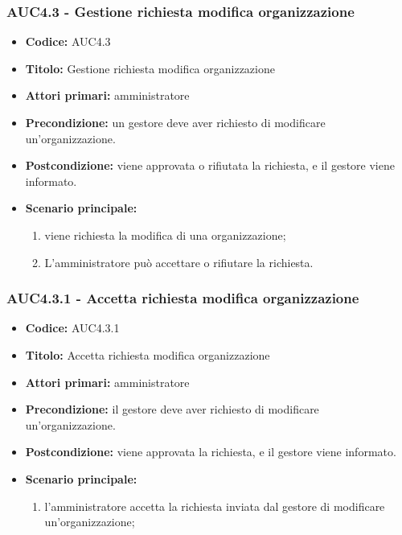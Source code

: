 \documentclass[casi-duso]{subfiles}
\begin{document}
\subsubsection{AUC4.3 - Gestione richiesta modifica organizzazione}%
\label{subsub:AUC4.3}
\begin{itemize}
  \item \textbf{Codice:} AUC4.3
  \item \textbf{Titolo:} Gestione richiesta modifica organizzazione
  \item \textbf{Attori primari:} amministratore
  \item \textbf{Precondizione:} un gestore deve aver richiesto di modificare un'organizzazione.
  \item \textbf{Postcondizione:} viene approvata o rifiutata la richiesta, e il gestore viene informato.
  \item \textbf{Scenario principale:}
  \begin{enumerate}
    \item viene richiesta la modifica di una organizzazione;
    \item L'amministratore può accettare o rifiutare la richiesta.
  \end{enumerate}
\end{itemize}

\subsubsection{AUC4.3.1 - Accetta richiesta modifica organizzazione}%
\label{subsub:AUC4.3.1}
\begin{itemize}
  \item \textbf{Codice:} AUC4.3.1
  \item \textbf{Titolo:} Accetta richiesta modifica organizzazione
  \item \textbf{Attori primari:} amministratore
  \item \textbf{Precondizione:} il gestore deve aver richiesto di modificare un'organizzazione.
  \item \textbf{Postcondizione:} viene approvata la richiesta, e il gestore viene informato.
  \item \textbf{Scenario principale:}
  \begin{enumerate}
    \item  l'amministratore accetta la richiesta inviata dal gestore di modificare un'organizzazione;
  \end{enumerate}
\end{itemize}
\end{document}
